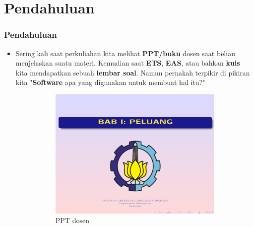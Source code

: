 \documentclass[aspectratio=169,10pt]{beamer}
\begin{document}
\section{Pendahuluan}
\begin{frame}
	\transwipe[direction=0]
	\frametitle{Pendahuluan}
	\begin{itemize}
	\item Sering kali saat perkuliahan kita melihat \textbf{PPT/buku} dosen saat 
    beliau menjelaskan suatu materi. Kemudian saat \textbf{ETS}, \textbf{EAS}, atau bahkan 
    \textbf{kuis} kita mendapatkan sebuah \textbf{lembar soal}. Namun pernakah terpikir di 
    pikiran kita "\textbf{Software} apa yang digunakan untuk membuat hal itu?"
    \begin{figure}[h!]
        \centering
        \begin{subfigure}[b]{0.3\linewidth}
          \includegraphics[width=\linewidth]{PPT_pak_fahim.png}
          \caption{PPT dosen}
          \label{fig:PPT}
        \end{subfigure}
        \begin{subfigure}[b]{0.15\linewidth}

\end{subfigure}
\end{figure}
\end{itemize}
\end{frame}
\end{document}
